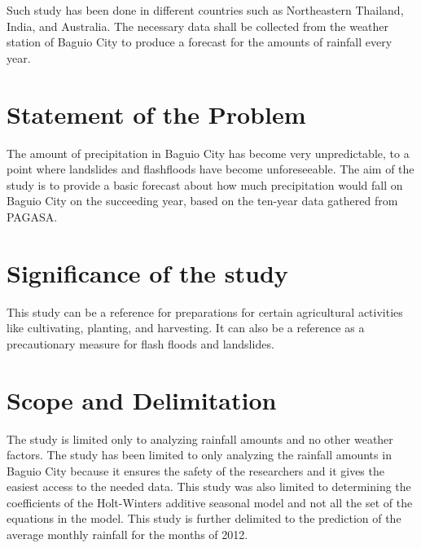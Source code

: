 	Such study has been done in different countries such as Northeastern Thailand, India, and Australia.  The necessary data shall be collected from the weather station of Baguio City to produce a forecast for the amounts of rainfall every year.
	
\section*{Statement of the Problem}

	The amount of precipitation in Baguio City has become very unpredictable, to a point where landslides and flashfloods have become unforeseeable. The aim of the study is to provide a basic forecast about how much precipitation would fall on Baguio City on the succeeding year, based on the ten-year data gathered from PAGASA.

%
%
\section*{Significance of the study}

This study can be a reference for preparations for certain agricultural activities like cultivating, planting, and harvesting.  It can also be a reference as a precautionary measure for flash floods and landslides.

\section*{Scope and Delimitation}

The study is limited only to analyzing rainfall amounts and no other weather factors.  The study has been limited to only analyzing the rainfall amounts in Baguio City because it ensures the safety of the researchers and it gives the easiest access to the needed data. This study was also limited to determining the coefficients of the Holt-Winters additive seasonal model and not all the set of the equations in the model. This study is further delimited to the prediction of the average monthly rainfall for the months of 2012.

